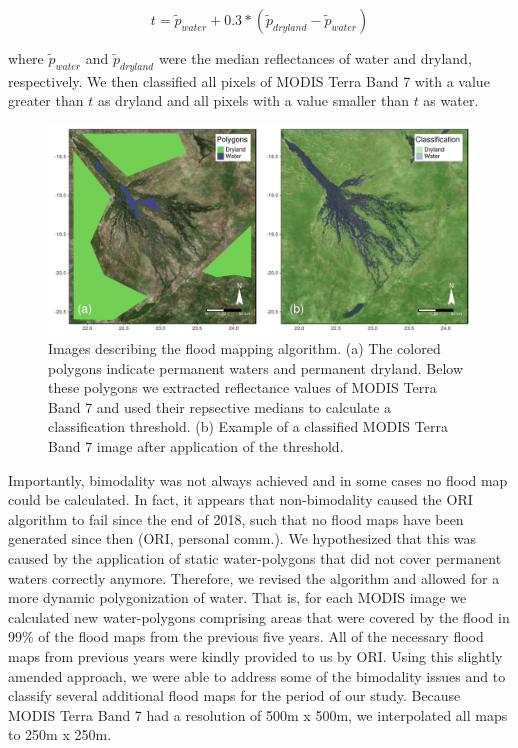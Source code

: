 \documentclass[abstract=off,10pt,a4paper,bibliography=totocnumbered]{article}
\begin{document}
\begin{equation}
\label{EQ1}
t = \widetilde{p}_{water} + 0.3 * (\widetilde{p}_{dryland} -
\widetilde{p}_{water})
\end{equation}

\noindent where \(\widetilde{p}_{water}\) and \(\widetilde{p}_{dryland}\) were
the median reflectances of water and dryland, respectively. We then classified
all pixels of MODIS Terra Band 7 with a value greater than \(t\) as dryland and
all pixels with a value smaller than \(t\) as water.

\begin{figure}[hbtp]
  \begin{center}
    \includegraphics[width = \textwidth]{99_Floodmapping.pdf}
    \caption{Images describing the flood mapping algorithm. (a) The colored
    polygons indicate permanent waters and permanent dryland. Below these
    polygons we extracted reflectance values of MODIS Terra Band 7 and used
    their repsective medians to calculate a classification threshold. (b)
    Example of a classified MODIS Terra Band 7 image after application of the
    threshold.}
    \label{Floodmapping}
  \end{center}
\end{figure}

\noindent Importantly, bimodality was not always achieved and in some cases no
flood map could be calculated. In fact, it appears that non-bimodality caused
the ORI algorithm to fail since the end of 2018, such that no flood maps have
been generated since then (ORI, personal comm.). We hypothesized that this was
caused by the application of static water-polygons that did not cover permanent
waters correctly anymore. Therefore, we revised the algorithm and allowed for a
more dynamic polygonization of water. That is, for each MODIS image we
calculated new water-polygons comprising areas that were covered by the flood in
99\% of the flood maps from the previous five years. All of the necessary
flood maps from previous years were kindly provided to us by ORI. Using this
slightly amended approach, we were able to address some of the bimodality issues
and to classify several additional flood maps for the period of our study.
Because MODIS Terra Band 7 had a resolution of 500m x 500m, we interpolated all
maps to 250m x 250m.
\end{document}
